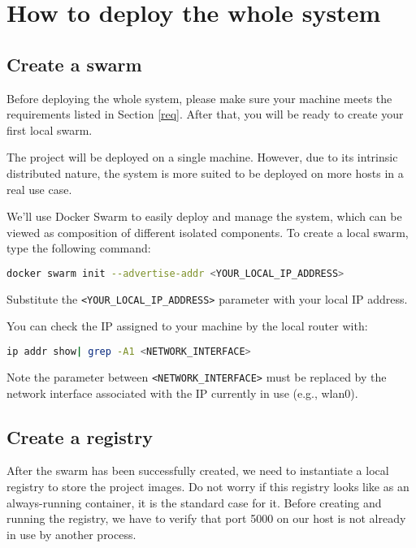 \section{How to deploy the whole system}

\subsection{Create a swarm}

Before deploying the whole system, please make sure your machine meets the
requirements listed in Section \ref{req}.
After that, you will be ready to create your first local swarm.

The project will be deployed on a single machine. However, due to its intrinsic
distributed nature, the system is more suited to be deployed on more hosts in
a real use case.

We'll use Docker Swarm to easily deploy and manage the system, which can be
viewed as composition of different isolated components.
To create a local swarm, type the following command:

\begin{lstlisting}[language=bash]
docker swarm init --advertise-addr <YOUR_LOCAL_IP_ADDRESS>
\end{lstlisting}

Substitute the \texttt{<YOUR\_LOCAL\_IP\_ADDRESS>} parameter with your local
IP address.

You can check the IP assigned to your machine by the local router with:

\begin{lstlisting}[language=bash]
ip addr show| grep -A1 <NETWORK_INTERFACE>
\end{lstlisting}

Note the parameter between \texttt{<NETWORK\_INTERFACE>} must
be replaced by the network interface associated with the IP currently in use
(e.g., wlan0).



\subsection{Create a registry}

After the swarm has been successfully created, we need to instantiate a local
registry to store the project images. Do not worry if this registry looks like
as an always-running container, it is the standard case for it.
Before creating and running the registry, we have to verify that port 5000
on our host is not already in use by another process.

